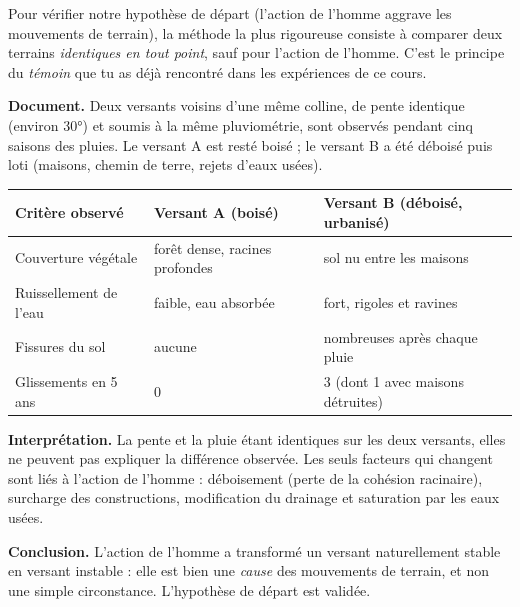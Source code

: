 \documentclass[11pt]{article}
\begin{document}
Pour vérifier notre hypothèse de départ (l'action de l'homme aggrave les mouvements de terrain), la méthode la plus rigoureuse consiste à comparer deux terrains \emph{identiques en tout point}, sauf pour l'action de l'homme. C'est le principe du \emph{témoin} que tu as déjà rencontré dans les expériences de ce cours.

\begin{experience}
\textbf{Document.} Deux versants voisins d'une même colline, de pente identique (environ 30°) et soumis à la même pluviométrie, sont observés pendant cinq saisons des pluies. Le versant A est resté boisé ; le versant B a été déboisé puis loti (maisons, chemin de terre, rejets d'eaux usées).

\begin{center}
\begin{tabularx}{\linewidth}{|l|X|X|}
\hline
\rowcolor{popblueL} \textbf{Critère observé} & \textbf{Versant A (boisé)} & \textbf{Versant B (déboisé, urbanisé)} \\
\hline
Couverture végétale & forêt dense, racines profondes & sol nu entre les maisons \\
\hline
Ruissellement de l'eau & faible, eau absorbée & fort, rigoles et ravines \\
\hline
Fissures du sol & aucune & nombreuses après chaque pluie \\
\hline
Glissements en 5 ans & 0 & 3 (dont 1 avec maisons détruites) \\
\hline
\end{tabularx}
\end{center}

\textbf{Interprétation.} La pente et la pluie étant identiques sur les deux versants, elles ne peuvent pas expliquer la différence observée. Les seuls facteurs qui changent sont liés à l'action de l'homme : déboisement (perte de la cohésion racinaire), surcharge des constructions, modification du drainage et saturation par les eaux usées.

\textbf{Conclusion.} L'action de l'homme a transformé un versant naturellement stable en versant instable : elle est bien une \emph{cause} des mouvements de terrain, et non une simple circonstance. L'hypothèse de départ est validée.
\end{experience}
\end{document}
